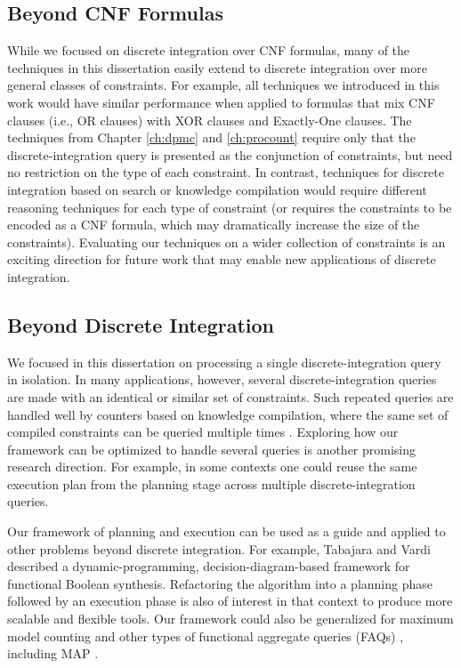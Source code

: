 \subsection{Beyond CNF Formulas}
While we focused on discrete integration over CNF formulas, many of the techniques in this dissertation easily extend to discrete integration over more general classes of constraints.
For example, all techniques we introduced in this work would have similar performance when applied to formulas that mix CNF clauses (i.e., OR clauses) with XOR clauses and Exactly-One clauses. %
The techniques from Chapter \ref{ch:dpmc} and \ref{ch:procount} require only that the discrete-integration query is presented as the conjunction of constraints, but need no restriction on the type of each constraint. 
In contrast, techniques for discrete integration based on search or knowledge compilation would require different reasoning techniques for each type of constraint (or requires the constraints to be encoded as a CNF formula, which may dramatically increase the size of the constraints).
Evaluating our techniques on a wider collection of constraints is an exciting direction for future work that may enable new applications of discrete integration.


\subsection{Beyond Discrete Integration}
We focused in this dissertation on processing a single discrete-integration query in isolation. 
In many applications, however, several discrete-integration queries are made with an identical or similar set of constraints.
Such repeated queries are handled well by counters based on knowledge compilation, where the same set of compiled constraints can be queried multiple times \cite{darwiche2002knowledge,koriche2013knowledge,LM17,darwiche2004new,OD15}.
Exploring how our framework can be optimized to handle several queries is another promising research direction.
For example, in some contexts one could reuse the same execution plan from the planning stage across multiple discrete-integration queries.

Our framework of planning and execution can be used as a guide and applied to other problems beyond discrete integration.
For example, Tabajara and Vardi \cite{tabajara2017factored} described a dynamic-programming, decision-diagram-based framework for functional Boolean synthesis.
Refactoring the algorithm into a planning phase followed by an execution phase is also of interest in that context to produce more scalable and flexible tools.
Our framework could also be generalized for maximum model counting \cite{fremont2017maximum} and other types of functional aggregate queries (FAQs) \cite{KNR16}, including MAP \cite{murphy2012machine,maua2015complexity,xue2016solving}.
